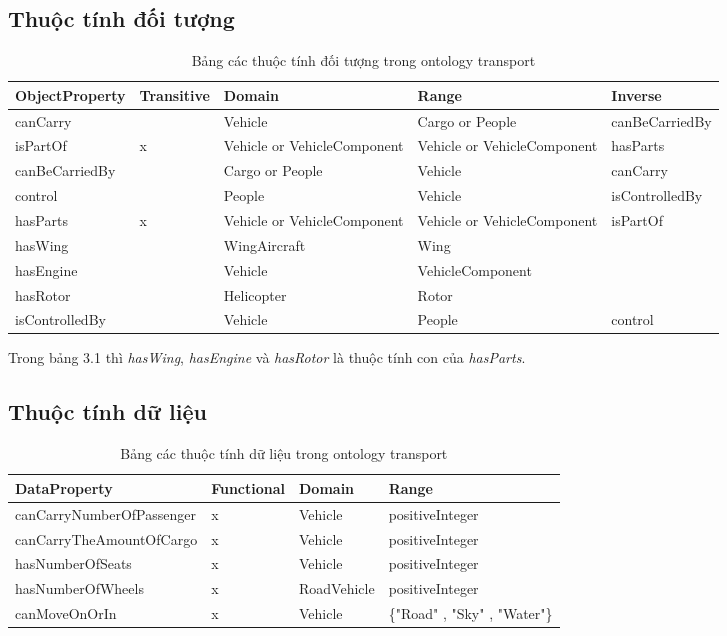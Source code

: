 {\subsection{Thuộc tính đối tượng}
\begin{table}[ht!]
	\centering
\begin{tabular}{|p{3cm}|l|p{3cm}|p{3cm}|p{3cm}|}
\hline
ObjectProperty & Transitive & Domain & Range & Inverse \\ \hline
canCarry & & Vehicle & Cargo or People & canBeCarriedBy \\ \hline
isPartOf & x & Vehicle or VehicleComponent & Vehicle or VehicleComponent & hasParts \\ \hline
canBeCarriedBy & & Cargo or People & Vehicle & canCarry \\ \hline
control &  & People & Vehicle & isControlledBy \\ \hline
hasParts & x & Vehicle or VehicleComponent & Vehicle or VehicleComponent & isPartOf \\ \hline
 hasWing & & WingAircraft & Wing & \\ \hline
 hasEngine & & Vehicle & VehicleComponent & \\ \hline
 hasRotor & & Helicopter & Rotor & \\ \hline
 isControlledBy & & Vehicle & People & control \\
\hline
\end{tabular}
\caption{Bảng các thuộc tính đối tượng trong ontology transport \label{overflow}}  
\end{table}
Trong bảng 3.1 thì \textit{hasWing}, \textit{hasEngine} và \textit{hasRotor} là thuộc tính con của \textit{hasParts}.
\subsection{Thuộc tính dữ liệu}
\begin{table}[ht!]
\centering
\begin{tabular}{|l|l|l|l|}
\hline
DataProperty & Functional & Domain & Range \\ \hline
canCarryNumberOfPassenger & x & Vehicle & positiveInteger \\ \hline
canCarryTheAmountOfCargo & x & Vehicle & positiveInteger  \\ \hline
hasNumberOfSeats & x & Vehicle & positiveInteger \\ \hline
hasNumberOfWheels & x & RoadVehicle & positiveInteger  \\ \hline
canMoveOnOrIn & x & Vehicle & \{"Road" , "Sky" , "Water"\}  \\ \hline
\end{tabular}
\caption{Bảng các thuộc tính dữ liệu trong ontology transport \label{overflow}}  
\end{table}
}
